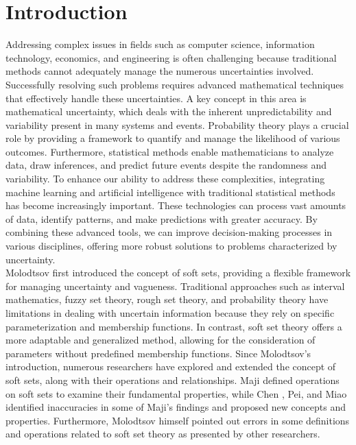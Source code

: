 \documentclass{article}
\theoremstyle{definition}
\begin{document}
\section{Introduction}
Addressing complex issues in fields such as computer science, information technology, economics, and engineering is often challenging because traditional methods cannot adequately manage the numerous uncertainties involved. Successfully resolving such problems requires advanced mathematical techniques that effectively handle these uncertainties. A key concept in this area is mathematical uncertainty, which deals with the inherent unpredictability and variability present in many systems and events. Probability theory plays a crucial role by providing a framework to quantify and manage the likelihood of various outcomes. Furthermore, statistical methods enable mathematicians to analyze data, draw inferences, and predict future events despite the randomness and variability. To enhance our ability to address these complexities, integrating machine learning and artificial intelligence with traditional statistical methods has become increasingly important. These technologies can process vast amounts of data, identify patterns, and make predictions with greater accuracy. By combining these advanced tools, we can improve decision-making processes in various disciplines, offering more robust solutions to problems characterized by uncertainty.\\

Molodtsov \cite{1} first introduced the concept of soft sets, providing a flexible framework for managing uncertainty and vagueness. Traditional approaches such as interval mathematics, fuzzy set theory, rough set theory, and probability theory have limitations in dealing with uncertain information because they rely on specific parameterization and membership functions. In contrast, soft set theory offers a more adaptable and generalized method, allowing for the consideration of parameters without predefined membership functions. Since Molodtsov's introduction, numerous researchers have explored and extended the concept of soft sets, along with their operations and relationships. Maji \cite{7} defined operations on soft sets to examine their fundamental properties, while Chen \cite{8}, Pei, and Miao \cite{9} identified inaccuracies in some of Maji's findings and proposed new concepts and properties. Furthermore, Molodtsov \cite{3} himself pointed out errors in some definitions and operations related to soft set theory as presented by other researchers.\\
\end{document}
